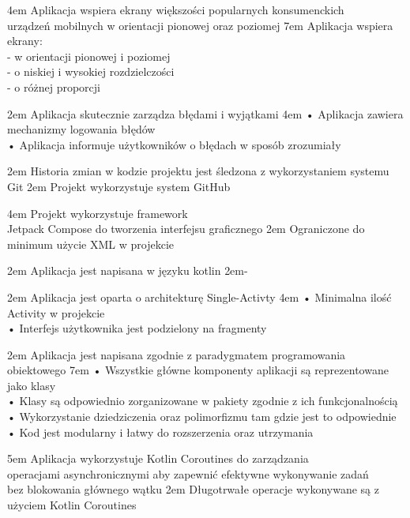 {4em}{
    Aplikacja wspiera ekrany większości popularnych konsumenckich\\
    urządzeń mobilnych w orientacji pionowej oraz poziomej
}
{7em}{
    Aplikacja wspiera ekrany:\\
    - w orientacji pionowej i poziomej\\
    - o niskiej i wysokiej rozdzielczości\\
    - o różnej proporcji
}

{2em}{
    Aplikacja skutecznie zarządza błędami i wyjątkami
}
{4em}{
    • Aplikacja zawiera mechanizmy logowania błędów\\
    • Aplikacja informuje użytkowników o błędach w sposób zrozumiały
}

{2em}{
    Historia zmian w kodzie projektu jest śledzona z wykorzystaniem systemu Git
}
{2em}{
    Projekt wykorzystuje system GitHub
}

{4em}{
    Projekt wykorzystuje framework\\
    Jetpack Compose do tworzenia interfejsu graficznego
}
{2em}{
    Ograniczone do minimum użycie XML w projekcie
}

{2em}{
    Aplikacja jest napisana w języku kotlin
}
{2em}{-}

{2em}{
    Aplikacja jest oparta o architekturę Single-Activty
}
{4em}{
    • Minimalna ilość Activity w projekcie\\
    • Interfejs użytkownika jest podzielony na fragmenty
}

{2em}{
    Aplikacja jest napisana zgodnie z paradygmatem programowania obiektowego
}
{7em}{
    • Wszystkie główne komponenty aplikacji są reprezentowane jako klasy\\
    • Klasy są odpowiednio zorganizowane w pakiety zgodnie z ich funkcjonalnością\\
    • Wykorzystanie dziedziczenia oraz polimorfizmu tam gdzie jest to odpowiednie\\
    • Kod jest modularny i łatwy do rozszerzenia oraz utrzymania
}

{5em}{
    Aplikacja wykorzystuje Kotlin Coroutines do zarządzania\\
    operacjami asynchronicznymi aby zapewnić efektywne wykonywanie zadań\\
    bez blokowania głównego wątku
}
{2em}{
    Długotrwałe operacje wykonywane są z użyciem Kotlin Coroutines
}

